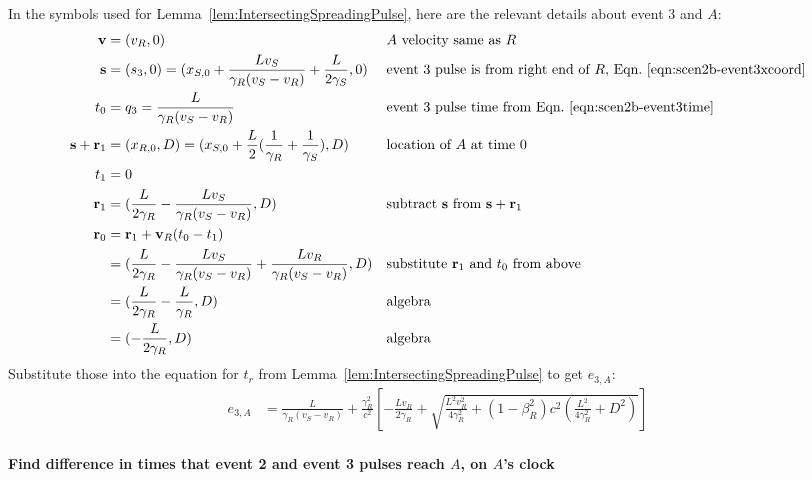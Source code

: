 \documentclass[a4paper]{article}
\theoremstyle{plain}
\theoremstyle{definition}
\newcommand{\vect}[1]{\mathbf{#1}}
\begin{document}
In the symbols used for Lemma~\ref{lem:IntersectingSpreadingPulse},
here are the relevant details about event 3 and $A$:
\begin{align*}
\vect{v} & = (v_R, 0) & & \text{$A$ velocity same as $R$} \\
\vect{s} & = (s_3,0) = (x_{S,0} + \frac{Lv_S}{\gamma_R(v_S - v_R)} + \frac{L}{2\gamma_S}, 0) & & \text{event 3 pulse is from right end of $R$, Eqn.~\eqref{eqn:scen2b-event3xcoord}} \\
t_0 & = q_3 = \frac{L}{\gamma_R(v_S - v_R)} & & \text{event 3 pulse time from Eqn.~\eqref{eqn:scen2b-event3time}} \\
\vect{s} + \vect{r}_1 & = (x_{R,0}, D) = (x_{S,0} + \frac{L}{2} ( \frac{1}{\gamma_R} + \frac{1}{\gamma_S} ), D) & & \text{location of $A$ at time 0} \\
t_1 & = 0 \\
\vect{r}_1 & = (\frac{L}{2\gamma_R} - \frac{Lv_S}{\gamma_R(v_S - v_R)}, D) & & \text{subtract $\vect{s}$ from $\vect{s}+\vect{r}_1$} \\
\vect{r}_0
  & = \vect{r}_1 + \vect{v}_R(t_0-t_1) \\
  & = (\frac{L}{2\gamma_R} - \frac{Lv_S}{\gamma_R(v_S - v_R)} + \frac{Lv_R}{\gamma_R(v_S - v_R)}, D) & & \text{substitute $\vect{r}_1$ and $t_0$ from above} \\
  & = (\frac{L}{2\gamma_R} - \frac{L}{\gamma_R}, D) & & \text{algebra} \\
  & = (-\frac{L}{2\gamma_R}, D) & & \text{algebra}
\end{align*}
Substitute those into the equation for $t_r$ from
Lemma~\ref{lem:IntersectingSpreadingPulse} to get $e_{3,A}$:
\begin{align*}
e_{3,A} & = \frac{L}{\gamma_R(v_S - v_R)} + \frac{\gamma_R^2}{c^2} \left[ -\frac{Lv_R}{2\gamma_R} + \sqrt{\frac{L^2v_R^2}{4\gamma_R^2} + (1-\beta_R^2)c^2 (\frac{L^2}{4\gamma_R^2} + D^2)} \right]
\end{align*}


\paragraph{Find difference in times that event 2 and event 3 pulses reach $A$, on $A$'s clock}
\end{document}
